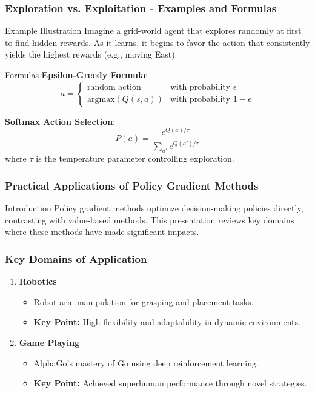 \documentclass[aspectratio=169]{beamer}
\begin{document}
\begin{frame}[fragile]
    \frametitle{Exploration vs. Exploitation - Examples and Formulas}
    \begin{block}{Example Illustration}
        Imagine a grid-world agent that explores randomly at first to find hidden rewards. 
        As it learns, it begins to favor the action that consistently yields the highest rewards (e.g., moving East).
    \end{block}
    \begin{block}{Formulas}
        \textbf{Epsilon-Greedy Formula}:
        \begin{equation}
        a = 
        \begin{cases} 
        \text{random action} & \text{with probability } \epsilon \\
        \text{argmax}(Q(s, a)) & \text{with probability } 1 - \epsilon
        \end{cases}
        \end{equation}
        
        \textbf{Softmax Action Selection}:
        \begin{equation}
        P(a) = \frac{e^{Q(a)/\tau}}{\sum_{a'} e^{Q(a')/\tau}}
        \end{equation}
        where $\tau$ is the temperature parameter controlling exploration.
    \end{block}
\end{frame}

\begin{frame}[fragile]
    \frametitle{Practical Applications of Policy Gradient Methods}
    \begin{block}{Introduction}
        Policy gradient methods optimize decision-making policies directly, contrasting with value-based methods. This presentation reviews key domains where these methods have made significant impacts.
    \end{block}
\end{frame}

\begin{frame}[fragile]
    \frametitle{Key Domains of Application}
    \begin{enumerate}
        \item \textbf{Robotics} 
            \begin{itemize}
                \item Robot arm manipulation for grasping and placement tasks.
                \item \textbf{Key Point:} High flexibility and adaptability in dynamic environments.
            \end{itemize}
        \item \textbf{Game Playing} 
            \begin{itemize}
                \item AlphaGo's mastery of Go using deep reinforcement learning.
                \item \textbf{Key Point:} Achieved superhuman performance through novel strategies.
            \end{itemize}
    \end{enumerate}
\end{frame}
\end{document}
